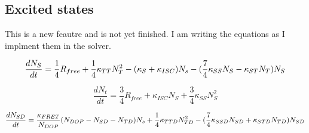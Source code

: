 \newpage
\begin{landscape}

\section{Excited states}
This is a new feautre and is not yet finished. I am writing the equations as I implment them in the solver.
\label{sec:electrical}

\begin{equation}
\frac{dN_{S}}{dt}=\frac{1}{4}R_{free}+\frac{1}{4}\kappa_{TT} N_{T}^{2}-\\
\\
(\kappa_{S}+\kappa_{ISC})N_{s}\\
\\
-(\frac{7}{4}\kappa_{SS} N_{S} -\kappa_{ST} N_{T})N_{S}
\end{equation}

\begin{equation}
\frac{dN_{t}}{dt}=\frac{3}{4}R_{free}+\kappa_{ISC} N_{S} + \frac{3}{4}\kappa_{SS} N_{S}^2
\end{equation}

\begin{equation}
\frac{dN_{SD}}{dt}=\frac{\kappa_{FRET}}{N_{DOP}} (N_{DOP}-N_{SD}-N_{TD})N_{s}\\
\\
+\frac{1}{4}\kappa_{TTD}N_{TD}^{2}
\\
-(\frac{7}{4}\kappa_{SSD} N_{SD}+\kappa_{STD}N_{TD}) N_{SD}
\end{equation}

\end{landscape}

